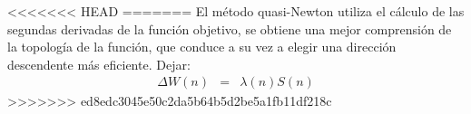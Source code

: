 

<<<<<<< HEAD
=======
El método quasi-Newton utiliza el cálculo de las segundas derivadas de la función objetivo, se obtiene una mejor comprensión de la topología de la función, que conduce a su vez a elegir una dirección descendente más eficiente. Dejar:
\begin{eqnarray}
	\Delta W(n) &=& \lambda(n)S(n)
\end{eqnarray}
>>>>>>> ed8edc3045e50c2da5b64b5d2be5a1fb11df218c








